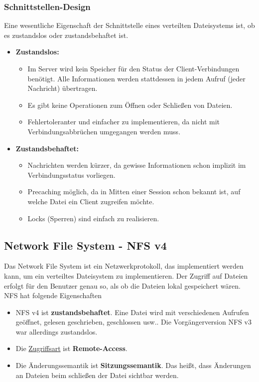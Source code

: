 \subsubsection{Schnittstellen-Design}
Eine wesentliche Eigenschaft der Schnittstelle eines verteilten Dateisystems ist, ob es zustandslos oder zustandsbehaftet ist.
\begin{itemize}
    \item \textbf{Zustandslos:}\\
          \begin{itemize}
              \item Im Server wird kein Speicher für den Status der Client-Verbindungen benötigt. Alle Informationen werden stattdessen in jedem Aufruf (jeder Nachricht) übertragen.
              \item Es gibt keine Operationen zum Öffnen oder Schließen von Dateien.
              \item Fehlertoleranter und einfacher zu implementieren, da nicht mit Verbindungsabbrüchen umgegangen werden muss.
          \end{itemize}
    \item \textbf{Zustandsbehaftet:}\\
          \begin{itemize}
              \item Nachrichten werden kürzer, da gewisse Informationen schon implizit im Verbindungsstatus vorliegen.
              \item Precaching möglich, da in Mitten einer Session schon bekannt ist, auf welche Datei ein Client zugreifen möchte.
              \item Locks (Sperren) sind einfach zu realisieren.
          \end{itemize}
\end{itemize}

\subsection{Network File System - NFS v4}

Das Network File System ist ein Netzwerkprotokoll, das implementiert werden kann, um ein verteiltes Dateisystem zu implementieren. Der Zugriff auf Dateien erfolgt für den Benutzer genau so, als ob die Dateien lokal gespeichert wären. NFS hat folgende Eigenschaften
\begin{itemize}
    \item NFS v4 ist \textbf{zustandsbehaftet}. Eine Datei wird mit verschiedenen Aufrufen geöffnet, gelesen geschrieben, geschlossen usw.. Die Vorgängerversion NFS v3 war allerdings zustandslos.
    \item Die \hyperref[sec:zugriffsmodelle]{Zugriffsart} ist \textbf{Remote-Access}.
    \item Die Änderungssemantik ist \textbf{Sitzungssemantik}. Das heißt, dass Änderungen an Dateien beim schließen der Datei sichtbar werden.
\end{itemize}

